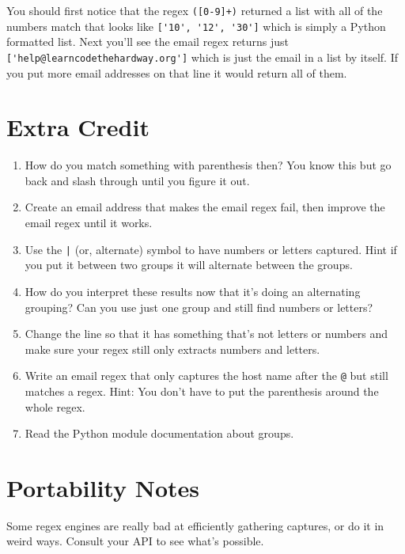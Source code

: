 You should first notice that the regex \verb|([0-9]+)| returned a list with all of the
numbers match that looks like \verb|['10', '12', '30']| which is simply a Python
formatted list.  Next you'll see the email regex returns just \verb|['help@learncodethehardway.org']|
which is just the email in a list by itself.  If you put more email addresses on that line
it would return all of them.

\section{Extra Credit}

\begin{enumerate}
\item How do you match something with parenthesis then?  You know this but go
    back and slash through until you figure it out.
\item Create an email address that makes the email regex fail, then improve the
    email regex until it works.
\item Use the \verb,|, (or, alternate) symbol to have numbers or letters captured.
    Hint if you put it between two groups it will alternate between the groups.
\item How do you interpret these results now that it's doing an alternating grouping?
    Can you use just one group and still find numbers or letters?
\item Change the line so that it has something that's not letters or numbers
    and make sure your regex still only extracts numbers and letters.
\item Write an email regex that only captures the host name after the \verb|@| but
    still matches a regex. Hint: You don't have to put the parenthesis around the
    whole regex.
\item Read the Python  module documentation about groups.
\end{enumerate}

\section{Portability Notes}

Some regex engines are really bad at efficiently gathering captures, or do it
in weird ways.  Consult your API to see what's possible.

